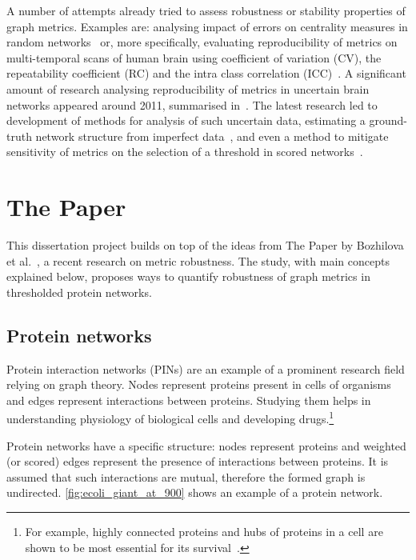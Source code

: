 A number of attempts already tried to assess robustness or stability properties of graph metrics.
Examples are: analysing impact of errors on centrality measures in random networks~\cite{BorgattiRobustnessCentralityMeasures2006} or, more specifically, evaluating reproducibility of metrics on multi-temporal scans of human brain using coefficient of variation (CV), the repeatability coefficient (RC) and the intra class correlation (ICC)~\cite{VaessenEffectReproducibilityDifferent2010,DennisTestRetestReliabilityGraph2012}.
A significant amount of research analysing reproducibility of metrics in uncertain brain networks appeared around 2011, summarised in~\cite{TelesfordExplorationGraphMetric2013}.
The latest research led to development of methods for analysis of such uncertain data, estimating a ground-truth network structure from imperfect data~\cite{Martin2016,Newman2018}, and even a method to mitigate sensitivity of metrics on the selection of a threshold in scored networks~\cite{Drakesmith2015}.


\section{The Paper}

This dissertation project builds on top of the ideas from The Paper by Bozhilova et al.~\cite{Bozhilova2019}, a recent research on metric robustness.
The study, with main concepts explained below, proposes ways to quantify robustness of graph metrics in thresholded protein networks.

\subsection{Protein networks}

Protein interaction networks (PINs) are an example of a prominent research field relying on graph theory.
Nodes represent proteins present in cells of organisms and edges represent interactions between proteins.
Studying them helps in understanding physiology of biological cells and developing drugs.\footnote{For example, highly connected proteins and hubs of proteins in a cell are shown to be most essential for its survival~\cite{JeongLethalityCentralityProtein2001,HeWhyHubsTend2006}.}

Protein networks have a specific structure: nodes represent proteins and weighted (or scored) edges represent the presence of interactions between proteins.
It is assumed that such interactions are mutual, therefore the formed graph is undirected.
\cref{fig:ecoli_giant_at_900} shows an example of a protein network.

